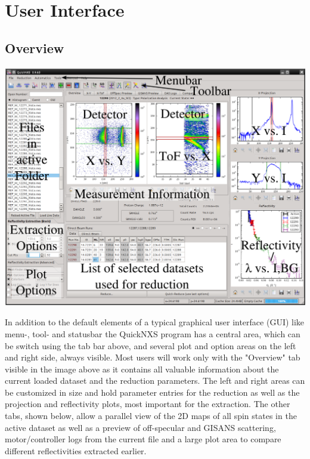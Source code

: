 \chapter{User Interface}
\label{chap:user_interface}

\section{Overview}
\def\svgwidth{\textwidth}
\begin{LARGE}
\includegraphics[width=455pt]{screenshots/overview_labels.png} 
\end{LARGE}

In addition to the default elements of a typical graphical user interface (GUI) like menu-, tool- and statusbar the QuickNXS program has a central area, which can be switch using the tab bar above, and several plot and option areas on the left and right side, always visible. Most users will work only with the "Overview" tab visible in the image above as it contains all valuable information about the current loaded dataset and the reduction parameters. 
The left and right areas can be customized in size and hold parameter entries for the reduction as well as the projection and reflectivity plots, most important for the extraction.
The other tabs, shown below, allow a parallel view of the 2D maps of all spin states in the active dataset as well as a preview of off-specular and GISANS scattering, motor/controller logs from the current file and a large plot area to compare different reflectivities extracted earlier.

